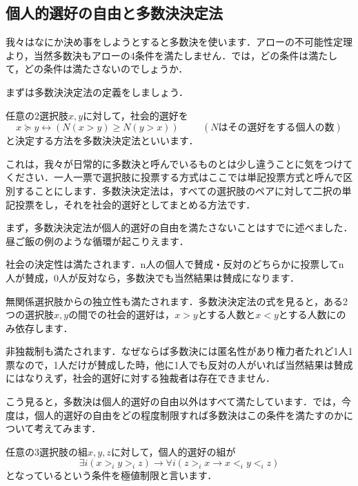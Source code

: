 \subsection{個人的選好の自由と多数決決定法}
我々はなにか決め事をしようとすると多数決を使います．アローの不可能性定理より，当然多数決もアローの4条件を満たしません．では，どの条件は満たして，どの条件は満たさないのでしょうか．

まずは多数決決定法の定義をしましょう．
\begin{dfn}[多数決決定法]
    任意の2選択肢$x,y$に対して，社会的選好を
    \begin{equation*}
        x \succeq y \leftrightarrow (N(x > y) \ge N(y > x)) \hspace{1cm} (Nはその選好をする個人の数)
    \end{equation*}
    と決定する方法を多数決決定法といいます．
\end{dfn}

これは，我々が日常的に多数決と呼んでいるものとは少し違うことに気をつけてください．一人一票で選択肢に投票する方式はここでは単記投票方式と呼んで区別することにします．多数決決定法は，すべての選択肢のペアに対して二択の単記投票をし，それを社会的選好としてまとめる方法です．

まず，多数決決定法が個人的選好の自由を満たさないことはすでに述べました．昼ご飯の例のような循環が起こりえます．

社会の決定性は満たされます．n人の個人で賛成・反対のどちらかに投票してn人が賛成，0人が反対なら，多数決でも当然結果は賛成になります．

無関係選択肢からの独立性も満たされます．多数決決定法の式を見ると，ある2つの選択肢$x,y$の間での社会的選好は，$x>y$とする人数と$x<y$とする人数にのみ依存します．

非独裁制も満たされます．なぜならば多数決には匿名性があり権力者たれど1人1票なので，1人だけが賛成した時，他に1人でも反対の人がいれば当然結果は賛成にはなりえず，社会的選好に対する独裁者は存在できません．

こう見ると，多数決は個人的選好の自由以外はすべて満たしています．では，今度は，個人的選好の自由をどの程度制限すれば多数決はこの条件を満たすのかについて考えてみます．

\begin{dfn}[極値制限]
    任意の3選択肢の組$x,y,z$に対して，個人的選好の組が
    \begin{equation*}
        \exists i (x >_i y >_i z) \to \forall i (z >_i x \to x <_i y <_i z)
    \end{equation*}
    となっているという条件を極値制限と言います．
\end{dfn}


